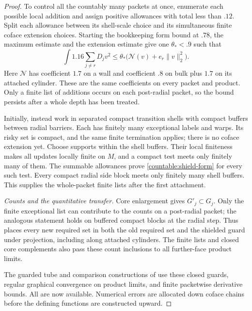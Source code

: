 \documentclass[11pt]{article}
\numberwithin{equation}{section}
\theoremstyle{definition}
\theoremstyle{remark}
\begin{document}
\begin{proof}
To control all the countably many packets at once, enumerate each
possible local addition and assign positive allowances with total less
than $.12$. Split each allowance between its shell-scale choice and
its simultaneous finite coface extension choices. Starting the
bookkeeping form bound at $.78$, the maximum estimate and the
extension estimate give one $\theta_*<.9$ such that
\begin{equation}\label{countable:shield-form}
 \int1.16\sum_{j\ne r}D_jv^2
 \le\theta_*\bigl(\mathcal N(v)+e_r\|v\|_2^2\bigr).
\end{equation}
Here $\mathcal N$ has coefficient $1.7$ on a wall and coefficient
$.8$ on bulk plus $1.7$ on its attached cylinder. These are the
same coefficients on every packet and product. Only a finite list of
additions occurs on each post-radial packet, so the bound persists
after a whole depth has been treated.

Initially, instead work in separated compact transition shells with
compact buffers between radial barriers. Each has finitely many
exceptional labels and warps. Its risky set is compact, and the same
finite termination applies; there is no coface extension yet. Choose
supports within the shell buffers. Their local finiteness makes all
updates locally finite on $M$, and a compact test meets only finitely
many of them. The summable allowances prove
\eqref{countable:shield-form} for every such test. Every compact radial
side block meets only finitely many shell buffers. This supplies the
whole-packet finite lists after the first attachment.

\emph{Counts and the quantitative transfer.}
Core enlargement gives $G'_j\subset G_j$. Only the finite exceptional
list can contribute to the counts on a post-radial packet; the analogous
statement holds on buffered compact blocks at the radial step.
Thus  places every new required set in both the old
required set and the shielded guard under projection, including along
attached cylinders. The finite lists and closed core complements also
pass these count inclusions to all further-face product limits.

The guarded tube and comparison constructions of
 use these closed guards,
regular graphical convergence on product limits, and finite
packetwise derivative bounds. All are now available. Numerical
errors are allocated down coface chains before the defining functions
are constructed upward.


\end{proof}
\end{document}
